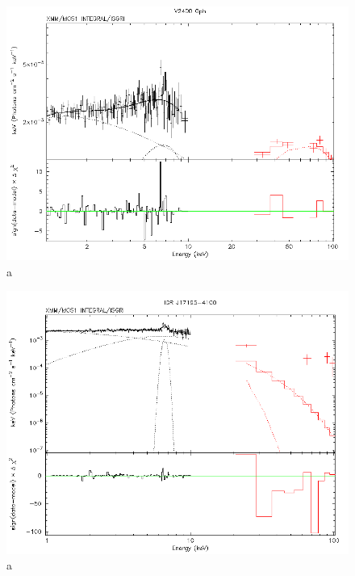 \documentclass[oneside,a4paper,11pt]{report}
\begin{document}
\begin{figure}[!hbt]
\centering
\includegraphics[totalheight=8cm]{spec/3}
\caption{a}
\label{sp1} 
\end{figure}

\begin{figure}[!hbt]
\centering
\includegraphics[totalheight=8cm]{spec/4}
\caption{a}
\label{sp1} 
\end{figure}
\end{document}
